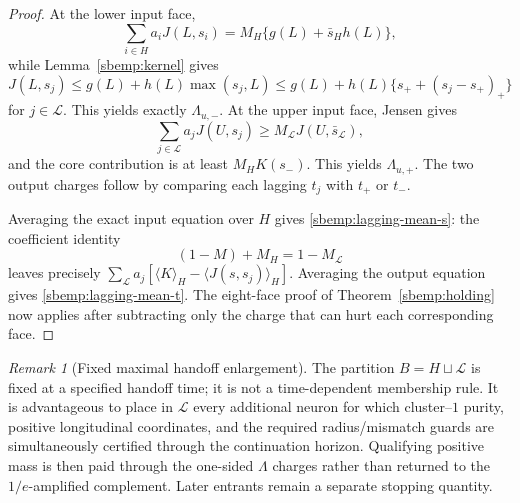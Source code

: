 \documentclass{article} %
\theoremstyle{plain}
\theoremstyle{definition}
\theoremstyle{remark}
\newtheorem{remark}[theorem]{Remark}
\begin{document}
\begin{proof}
At the lower input face,
\[
 \sum_{i\in H}a_iJ(L,s_i)
 =M_H\{g(L)+\bar s_Hh(L)\},
\]
while Lemma~\ref{sbemp:kernel} gives
\[
 J(L,s_j)\le g(L)+h(L)\max(s_j,L)
 \le g(L)+h(L)\{s_++(s_j-s_+)_+\}
\]
for $j\in\mathcal L$.  This yields exactly $\Lambda_{u,-}$.  At the
upper input face, Jensen gives
\[
 \sum_{j\in\mathcal L}a_jJ(U,s_j)
 \ge M_{\mathcal L}J(U,\bar s_{\mathcal L}),
\]
and the core contribution is at least $M_HK(s_-)$.  This yields
$\Lambda_{u,+}$.  The two output charges follow by comparing each lagging
$t_j$ with $t_+$ or $t_-$.

Averaging the exact input equation over $H$ gives
\eqref{sbemp:lagging-mean-s}: the coefficient identity
\[
 (1-M)+M_H=1-M_{\mathcal L}
\]
leaves precisely
$\sum_{\mathcal L}a_j[\langle K\rangle_H-
\langle J(s,s_j)\rangle_H]$.  Averaging the output equation gives
\eqref{sbemp:lagging-mean-t}.  The eight-face proof of
Theorem~\ref{sbemp:holding} now applies after subtracting only the charge
that can hurt each corresponding face.
\end{proof}

\begin{remark}[Fixed maximal handoff enlargement]
\label{sbemp:maximal-handoff}
The partition $B=H\sqcup\mathcal L$ is fixed at a specified handoff time;
it is not a time-dependent membership rule.  It is advantageous to place in
$\mathcal L$ every additional neuron for which cluster--$1$ purity,
positive longitudinal coordinates, and the required radius/mismatch guards
are simultaneously certified through the continuation horizon.  Qualifying
positive mass is then paid through the one-sided $\Lambda$ charges rather
than returned to the $1/e$-amplified complement.  Later entrants remain a
separate stopping quantity.
\end{remark}
\end{document}
